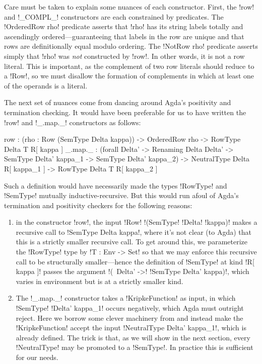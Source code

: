 \documentclass[sigplan,10pt,anonymous,review]{acmart}\settopmatter{printfolios=true,printccs=false,printacmref=false}
\begin{document}
Care must be taken to explain some nuances of each constructor. First, the !row! and !_COMPL_! constructors are each constrained by predicates. The !OrderedRow rho! predicate asserts that !rho! has its string labels totally and ascendingly ordered---guaranteeing that labels in the row are unique and that rows are definitionally equal modulo ordering. The !NotRow rho! predicate asserts simply that !rho! was \emph{not} constructed by !row!. In other words, it is not a row literal. This is important, as the complement of two row literals should reduce to a !Row!, so we must disallow the formation of complements in which at least one of the operands is a literal. 

The next set of nuances come from dancing around Agda's positivity and termination checking. It would have been preferable for us to have written the !row! and !_.map._! constructors as follows: 
\begin{agda}
  row      : (rho : Row (SemType Delta kappa)) -> 
             OrderedRow rho -> 
             RowType Delta T R[ kappa ]
  _.map._  : (forall {Delta'} -> 
                Renaming Delta Delta' -> 
                SemType Delta' kappa_1 -> 
                SemType Delta' kappa_2) -> 
             NeutralType Delta R[ kappa_1 ] -> 
             RowType Delta T R[ kappa_2 ]
\end{agda}

\Ni Such a definition would have necessarily made the types !RowType! and !SemType! mutually inductive-recursive. But this would run afoul of Agda's termination and positivity checkers for the following reasons:
\begin{enumerate}
  \item in the constructor !row!, the input !Row! !(SemType! !Delta! !kappa)! makes a recursive call to !SemType Delta kappa!, where it's not clear (to Agda) that this is a strictly smaller recursive call. To get around this, we parameterize the !RowType! type by !T : Env -> Set! so that we may enforce this recursive call to be structurally smaller---hence the definition of !SemType! at kind !R[ kappa ]! passes the argument !(\ Delta' ->! !SemType Delta' kappa)!, which varies in environment but is at a strictly smaller kind.
  \item  The !_.map._! constructor takes a !KripkeFunction! as input, in which !SemType! !Delta' kappa_1! occurs negatively, which Agda must outright reject. Here we borrow some clever machinery from \citet{AllaisBM13} and instead make the !KripkeFunction! accept the input !NeutralType Delta' kappa_1!, which is already defined. The trick is that, as we will show in the next section, every !NeutralType! may be promoted to a !SemType!. In practice this is sufficient for our needs.
\end{enumerate}
\end{document}
